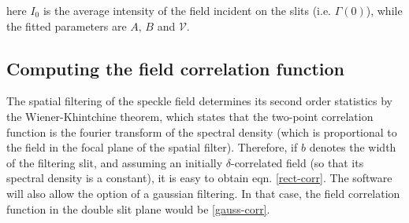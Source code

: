 here $I_0$ is the average intensity of the field incident on the slits (i.e. $\Gamma(0)$), while the fitted parameters are $A, \, B$ and $\mathcal V$.

\subsection{Computing the field correlation function} \label{comp_corr}

The spatial filtering of the speckle field determines its second order statistics by the Wiener-Khintchine theorem, which states that the two-point correlation 
function is the fourier transform of the spectral density (which is proportional to the field in the focal plane of the spatial filter). Therefore, if $b$ denotes 
the width of the filtering slit, and assuming an initially $\delta$-correlated field (so that its spectral density is a constant), it is easy to obtain eqn. 
\eqref{rect-corr}. The software will also allow the option of a gaussian filtering. In that case, the field correlation function in the double slit plane would be \eqref{gauss-corr}.